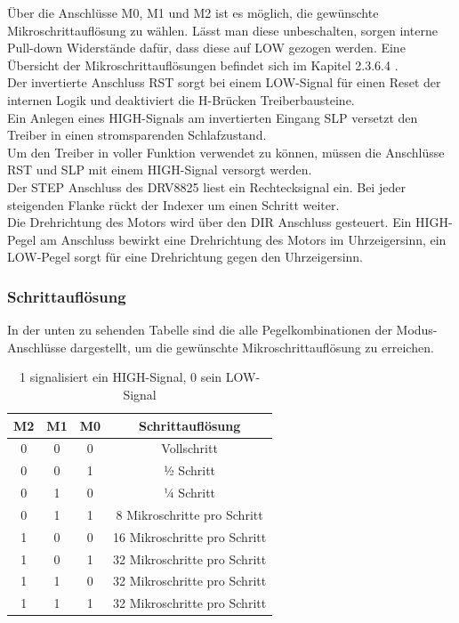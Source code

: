 Über die Anschlüsse M0, M1 und M2 ist es möglich, die gewünschte Mikroschrittauflösung zu wählen.
Lässt man diese unbeschalten, sorgen interne Pull-down Widerstände dafür, dass diese auf LOW gezogen werden.
Eine Übersicht der Mikroschrittauflösungen befindet sich im Kapitel 2.3.6.4 . \\

Der invertierte Anschluss RST sorgt bei einem LOW-Signal für einen Reset der internen Logik und deaktiviert die H-Brücken Treiberbausteine. \\

Ein Anlegen eines HIGH-Signals am invertierten Eingang SLP versetzt den Treiber in einen stromsparenden Schlafzustand. \\

Um den Treiber in voller Funktion verwendet zu können, müssen die Anschlüsse RST und SLP mit einem HIGH-Signal versorgt werden. \\

Der STEP Anschluss des DRV8825 liest ein Rechtecksignal ein.
Bei jeder steigenden Flanke rückt der Indexer um einen Schritt weiter. \\

Die Drehrichtung des Motors wird über den DIR Anschluss gesteuert.
Ein HIGH-Pegel am Anschluss bewirkt eine Drehrichtung des Motors im Uhrzeigersinn, ein LOW-Pegel sorgt für eine Drehrichtung gegen den Uhrzeigersinn.

\subsubsection{Schrittauflösung}
In der unten zu sehenden Tabelle sind die alle Pegelkombinationen der Modus-Anschlüsse dargestellt, um die gewünschte Mikroschrittauflösung zu erreichen.

\begin{table}[h]
    \centering
    \begin{tabular}{|c|c|c|c|}
        \hline
        \textbf{M2} & \textbf{M1} & \textbf{M0} & \textbf{Schrittauflösung}    \\ \hline
        0 & 0 & 0 & Vollschritt                  \\ \hline
        0 & 0 & 1 & ½ Schritt                    \\ \hline
        0 & 1 & 0 & ¼ Schritt                    \\ \hline
        0 & 1 & 1 & 8 Mikroschritte pro Schritt  \\ \hline
        1 & 0 & 0 & 16 Mikroschritte pro Schritt \\ \hline
        1 & 0 & 1 & 32 Mikroschritte pro Schritt \\ \hline
        1 & 1 & 0 & 32 Mikroschritte pro Schritt \\ \hline
        1 & 1 & 1 & 32 Mikroschritte pro Schritt \\ \hline
    \end{tabular}
    \caption{1 signalisiert ein HIGH-Signal, 0 sein LOW-Signal}
\end{table}

